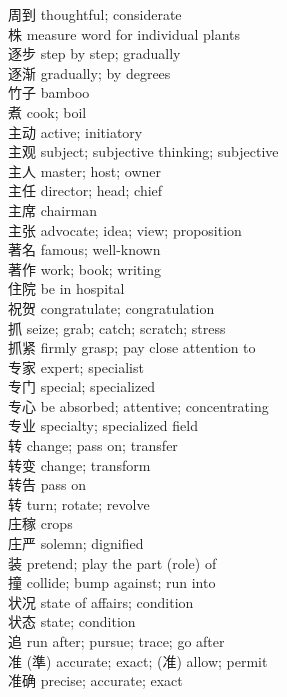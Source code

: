 周到 \quad thoughtful; considerate\\
株 \quad measure word for individual plants\\
逐步 \quad step by step; gradually\\
逐渐 \quad gradually; by degrees\\
竹子 \quad bamboo\\
煮 \quad cook; boil\\
主动 \quad active; initiatory\\
主观 \quad subject; subjective thinking; subjective\\
主人 \quad master; host; owner\\
主任 \quad director; head; chief\\
主席 \quad chairman\\
主张 \quad advocate; idea; view; proposition\\
著名 \quad famous; well-known\\
著作 \quad work; book; writing\\
住院 \quad be in hospital\\
祝贺 \quad congratulate; congratulation\\
抓 \quad seize; grab; catch; scratch; stress\\
抓紧 \quad firmly grasp; pay close attention to\\
专家 \quad expert; specialist\\
专门 \quad special; specialized\\
专心 \quad be absorbed; attentive; concentrating\\
专业 \quad specialty; specialized field\\
转 \quad change; pass on; transfer\\
转变 \quad change; transform\\
转告 \quad pass on\\
转 \quad turn; rotate; revolve\\
庄稼 \quad crops\\
庄严 \quad solemn; dignified\\
装 \quad pretend; play the part (role) of\\
撞 \quad collide; bump against; run into\\
状况 \quad state of affairs; condition\\
状态 \quad state; condition\\
追 \quad run after; pursue; trace; go after\\
准 \quad (準) accurate; exact; (准) allow; permit\\
准确 \quad precise; accurate; exact\\
